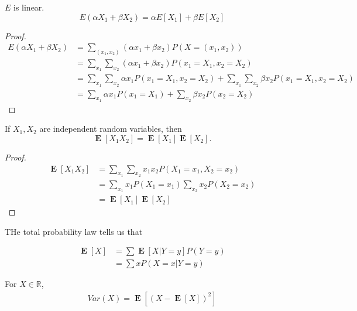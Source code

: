 \documentclass{article}
\theoremstyle{problemstyle}
\newcommand{\R}{\mathbb R}
\DeclareMathOperator{\E}{\mathbf{E}}
\begin{document}
\begin{theorem}
  $ E $ is linear.
  \begin{displaymath}
    E(\alpha X_1 + \beta X_2) = \alpha E[X_1] + \beta E[X_2]
  \end{displaymath}
  
\end{theorem}
\begin{proof}
  
  \begin{align*}
    E(\alpha X_1 + \beta X_2) &= \sum_{(x_1, x_2)} (\alpha x_1 + \beta x_2)P(X=(x_1,x_2))\\
                              &= \sum_{x_1}\sum_{x_2} (\alpha x_1 +\beta x_2)P(x_1=X_1, x_2=X_2)\\
                              &= \sum_{x_1}\sum_{x_2}\alpha x_1P(x_1=X_1, x_2=X_2) + \sum_{x_1}\sum_{x_2} \beta x_2P(x_1=X_1, x_2=X_2)\\
                              &= \sum_{x_1} \alpha x_1 P(x_1=X_1) + \sum_{x_2}\beta x_2P(x_2=X_2)
  \end{align*}
  
\end{proof}

\begin{theorem}
  If $ X_1, X_2 $ are independent random variables, then
  \[
    \E[X_1X_2] = \E[X_1]\E[X_2].
  \]
  
\end{theorem}
\begin{proof}
  \begin{align*}
    \E[X_1X_2] &= \displaystyle\sum_{x_1} \sum_{x_2} x_1x_2P(X_1=x_1, X_2=x_2) \\ 
               &= \sum_{x_1}x_1P(X_1=x_1)\sum_{x_2}x_2P(X_2=x_2) \\
               &= \E[X_1]\E[X_2]
  \end{align*}
\end{proof}

THe total probability law tells us that

\begin{align*}
  \E[X] &= \displaystyle\sum \E[X|Y=y]P(Y=y)\\
  &= \sum x P(X=x|Y=y)
\end{align*}

\begin{definition}
  For $ X\in \R $,
  \begin{align*}
    Var(X) = \E[(X-\E[X])^2] 
  \end{align*}
\end{definition}
\end{document}
